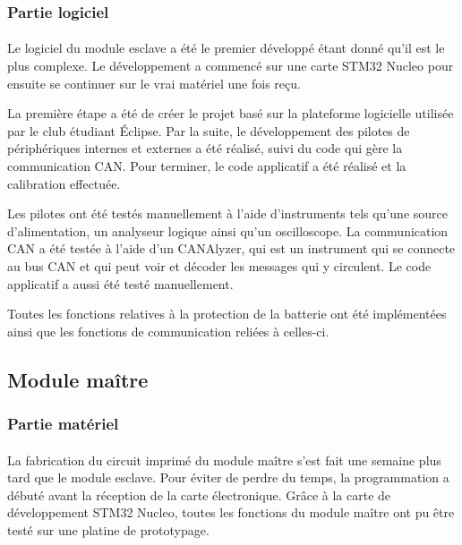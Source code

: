 		\subsubsection{Partie logiciel}

			\paragraph{}
			Le logiciel du module esclave a été le premier développé étant donné qu'il est le plus complexe. Le développement a commencé sur une carte STM32 Nucleo pour ensuite se continuer sur le vrai matériel une fois reçu.

			La première étape a été de créer le projet basé sur la plateforme logicielle utilisée par le club étudiant Éclipse. Par la suite, le développement des pilotes de périphériques internes et externes a été réalisé, suivi du code qui gère la communication CAN. Pour terminer, le code applicatif a été réalisé et la calibration effectuée.

			Les pilotes ont été testés manuellement à l'aide d'instruments tels qu'une source d'alimentation, un analyseur logique ainsi qu'un oscilloscope. La communication CAN a été testée à l'aide d'un CANAlyzer, qui est un instrument qui se connecte au bus CAN et qui peut voir et décoder les messages qui y circulent. Le code applicatif a aussi été testé manuellement.

			Toutes les fonctions relatives à la protection de la batterie ont été implémentées ainsi que les fonctions de communication reliées à celles-ci.



	\subsection{Module maître}

		\subsubsection{Partie matériel}

			\paragraph{}
			La fabrication du circuit imprimé du module maître s’est fait une semaine plus tard que le module esclave. Pour éviter de perdre du temps, la programmation a débuté avant la réception de la carte électronique. Grâce à la carte de développement STM32 Nucleo, toutes les fonctions du module maître ont pu être testé sur une platine de prototypage.

